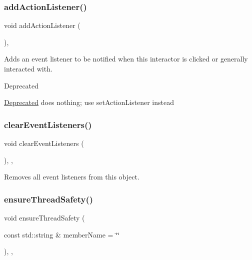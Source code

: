 \subsubsection{\texorpdfstring{add\+Action\+Listener()}{addActionListener()}}
{\footnotesize\ttfamily void add\+Action\+Listener (\begin{DoxyParamCaption}{ }\end{DoxyParamCaption})\hspace{0.3cm}{\ttfamily [virtual]}, {\ttfamily [inherited]}}



Adds an event listener to be notified when this interactor is clicked or generally interacted with. 

\begin{DoxyRefDesc}{Deprecated}
\item[\mbox{\hyperlink{deprecated__deprecated000006}{Deprecated}}]does nothing; use set\+Action\+Listener instead \end{DoxyRefDesc}
\mbox{\label{classGObservable_a80cfa040459ff53594adbd6a51ec8f43}} 
\subsubsection{\texorpdfstring{clear\+Event\+Listeners()}{clearEventListeners()}}
{\footnotesize\ttfamily void clear\+Event\+Listeners (\begin{DoxyParamCaption}{ }\end{DoxyParamCaption})\hspace{0.3cm}{\ttfamily [protected]}, {\ttfamily [virtual]}, {\ttfamily [inherited]}}



Removes all event listeners from this object. 

\mbox{\label{classGObservable_a284f31528c0520f8e545c03ac9eeac74}} 
\subsubsection{\texorpdfstring{ensure\+Thread\+Safety()}{ensureThreadSafety()}}
{\footnotesize\ttfamily void ensure\+Thread\+Safety (\begin{DoxyParamCaption}\item[{const std\+::string \&}]{member\+Name = {\ttfamily \char`\"{}\char`\"{}} }\end{DoxyParamCaption})\hspace{0.3cm}{\ttfamily [protected]}, {\ttfamily [virtual]}, {\ttfamily [inherited]}}



